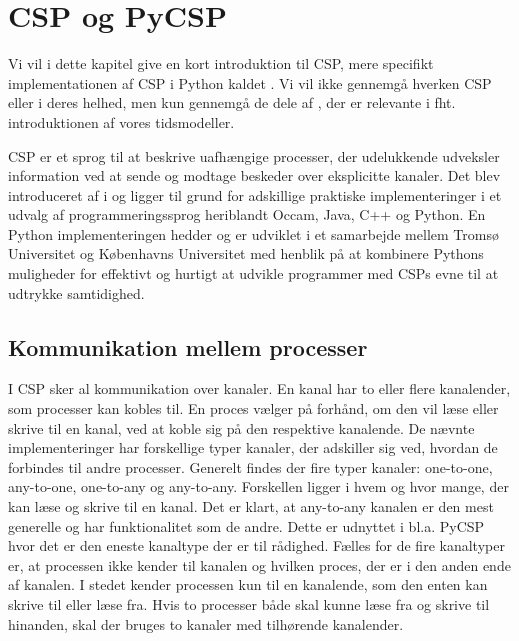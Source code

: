 \chapter{CSP og PyCSP}\label{sec:csp}


Vi vil i dette kapitel give en kort introduktion til CSP, mere specifikt implementationen af CSP i Python kaldet \pycsp. Vi vil ikke gennemgå hverken CSP eller \pycsp i deres helhed, men kun gennemgå de dele af \pycsp, der er relevante i fht. introduktionen af vores tidsmodeller. 

CSP er et sprog til at beskrive uafhængige processer, der udelukkende udveksler information ved at sende og modtage beskeder over eksplicitte kanaler. Det blev introduceret af \citeauthor{hoare-csp} i \cite{hoare-csp} og ligger til grund for adskillige praktiske implementeringer i et udvalg af programmeringssprog heriblandt Occam, Java, C++ og Python\cite{May1983, jcsp, Brown2007, pycsp}. En Python implementeringen hedder \pycsp og er udviklet i et samarbejde mellem Tromsø Universitet og Københavns Universitet med henblik på at kombinere  Pythons muligheder  for effektivt og hurtigt at udvikle programmer med CSPs evne til at udtrykke samtidighed\cite{pycsp}. 

\section{Kommunikation mellem processer}
I CSP sker al kommunikation over kanaler. En kanal har to eller flere kanalender, som processer kan kobles til. En proces vælger på forhånd, om den vil læse eller skrive til en kanal, ved at koble sig på den respektive kanalende. De nævnte implementeringer har forskellige typer kanaler, der adskiller sig ved,  hvordan de forbindes til andre processer. Generelt findes der fire typer kanaler: one-to-one, any-to-one, one-to-any og any-to-any. Forskellen ligger i hvem og hvor mange, der kan læse og skrive til en kanal. Det er klart, at any-to-any kanalen er den mest generelle og har funktionalitet som de andre. Dette er udnyttet i bl.a. PyCSP hvor det er den eneste kanaltype der er til rådighed. Fælles for de fire kanaltyper er, at processen ikke kender til kanalen og hvilken proces, der er i den anden ende af kanalen. I stedet kender processen kun til en  kanalende, som  den enten kan skrive til eller læse fra. Hvis to processer både skal kunne læse fra og skrive til hinanden, skal der bruges to kanaler med tilhørende kanalender. 

